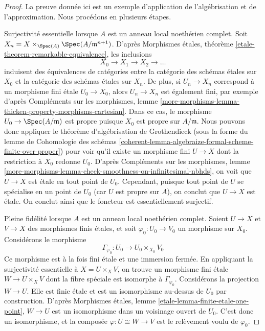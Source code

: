 \begin{proof}
La preuve donnée ici est un exemple d'application de l'algébrisation et de
l'approximation. Nous procédons en plusieurs étapes.

\medskip\noindent
Surjectivité essentielle lorsque $A$ est un anneau local noethérien complet.
Soit $X_n = X \times_{\Spec(A)} \Spec(A/\mathfrak m^{n + 1})$.
D'après Morphismes étales, théorème \ref{etale-theorem-remarkable-equivalence},
les inclusions
$$
X_0 \to X_1 \to X_2 \to \ldots
$$
induisent des équivalences de catégories entre la catégorie
des schémas étales sur $X_0$ et la catégorie des schémas
étales sur $X_n$.
De plus, si $U_n \to X_n$ correspond à un morphisme fini étale
$U_0 \to X_0$, alors $U_n \to X_n$ est également fini, par exemple
d'après Compléments sur les morphismes, lemme
\ref{more-morphisms-lemma-thicken-property-morphisms-cartesian}.
Dans ce cas, le morphisme $U_0 \to \Spec(A/\mathfrak m)$
est propre puisque $X_0$ est propre sur $A/\mathfrak m$. Nous pouvons donc appliquer
le théorème d'algébrisation de Grothendieck
(sous la forme du
lemme de Cohomologie des schémas
\ref{coherent-lemma-algebraize-formal-scheme-finite-over-proper})
pour voir qu'il existe un morphisme fini $U \to X$ dont la restriction
à $X_0$ redonne $U_0$. D'après Compléments sur les morphismes, lemme
\ref{more-morphisms-lemma-check-smoothness-on-infinitesimal-nbhds},
on voit que $U \to X$ est étale en tout point de $U_0$.
Cependant, puisque tout point de $U$ se spécialise en un point de $U_0$
(car $U$ est propre sur $A$), on conclut que $U \to X$ est étale.
On conclut ainsi que le foncteur est essentiellement surjectif.

\medskip\noindent
Pleine fidélité lorsque $A$ est un anneau local noethérien complet.
Soient $U \to X$ et $V \to X$ des morphismes finis étales, et
soit $\varphi_0 : U_0 \to V_0$ un morphisme sur $X_0$. Considérons
le morphisme
$$
\Gamma_{\varphi_0} : U_0 \longrightarrow U_0 \times_{X_0} V_0
$$
Ce morphisme est à la fois fini étale et une immersion fermée.
En appliquant la surjectivité essentielle à $X = U \times_X V$, on trouve
un morphisme fini étale $W \to U \times_X V$ dont la fibre spéciale
est isomorphe à $\Gamma_{\varphi_0}$. Considérons la projection
$W \to U$. Elle est finie étale et est un isomorphisme au-dessus de $U_0$ par
construction. D'après Morphismes étales, lemme
\ref{etale-lemma-finite-etale-one-point},
$W \to U$ est un isomorphisme dans un voisinage ouvert de $U_0$.
C'est donc un isomorphisme, et la composée $\varphi : U \cong W \to V$
est le relèvement voulu de $\varphi_0$.


\end{proof}
